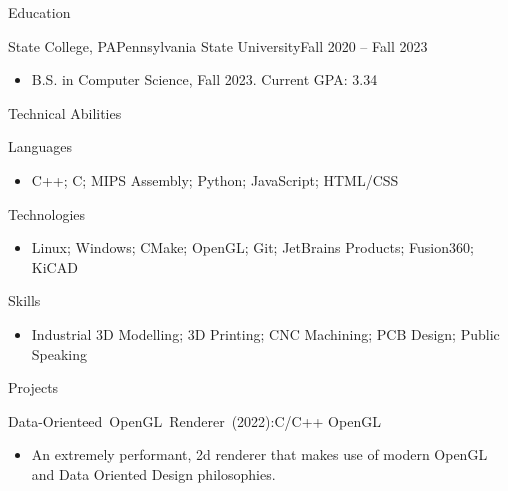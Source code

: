 \documentclass[]{cv}
\begin{document}
	
	\makeheader
	
	\begin{cvsection}{Education}
		\begin{cvsubsection}{State College, PA}{Pennsylvania State University}{Fall 2020 -- Fall 2023}
			\begin{itemize}
				\item B.S. in Computer Science, Fall 2023.   \hfill Current GPA: 3.34
			\end{itemize}
		\end{cvsubsection}
	\end{cvsection}

	\begin{cvsection}{Technical Abilities}
		\begin{cvsubsection}{Languages}{}{}	
			\begin{itemize}
				\item C++; C; MIPS Assembly; Python; JavaScript; HTML/CSS
			\end{itemize}
		\end{cvsubsection}
		\begin{cvsubsection}{Technologies}{}{}	
			\begin{itemize}
				\item Linux; Windows; CMake; OpenGL; Git; JetBrains Products; Fusion360; KiCAD
			\end{itemize}
		\end{cvsubsection}
		\begin{cvsubsection}{Skills}{}{}	
			\begin{itemize}
				\item Industrial 3D Modelling; 3D Printing; CNC Machining; PCB Design; Public Speaking
			\end{itemize}
		\end{cvsubsection}
	\end{cvsection}

	\begin{cvsection}{Projects}
		\begin{cvsubsection}{\mbox{Data-Orienteed OpenGL Renderer (2022):}}{}{C/C++ OpenGL}
			\begin{itemize}
				\item  An extremely performant, 2d renderer that makes use of modern OpenGL and Data Oriented Design philosophies.
			\end{itemize}
		\end{cvsubsection}
	\end{cvsection}
	
\end{document}
